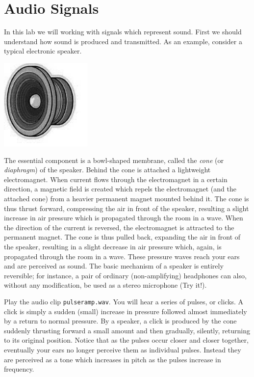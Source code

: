 \def\x{{\bf x}}
\def\q{{\bf q}}
\def\p{{\bf p}}
\def\v{{\bf v}}


\section*{Audio Signals}

In this lab we will working with signals which represent sound. First we should understand how sound is produced and transmitted. As an example, consider a typical electronic speaker.

\begin{center}\includegraphics[width=45mm]{speaker}\end{center}

The essential component is a bowl-shaped membrane, called the \emph{cone} (or \emph{diaphragm}) of the speaker. Behind the cone is attached a lightweight electromagnet. When current flows through the electromagnet in a certain direction, a magnetic field is created which repels the electromagnet (and the attached cone) from a  heavier permanent magnet mounted behind it. The cone is thus thrust forward, compressing the air in front of the speaker, resulting a slight increase in air pressure which is propagated through the room in a wave. When the direction of the current is reversed, the electromagnet is attracted to the permanent magnet. The cone is thus pulled back, expanding the air in front of the speaker, resulting in a slight decrease in air pressure which, again, is propagated through the room in a wave. These pressure waves reach your ears and are perceived as sound. The basic mechanism of a speaker is entirely reversible; for instance, a pair of ordinary (non-amplifying) headphones can also, without any modification, be used as a stereo microphone (Try it!).

Play the audio clip \texttt{pulseramp.wav}. You will hear a series of pulses, or clicks. A click is simply a sudden (small) increase in pressure followed almost immediately by a return to normal pressure. By a speaker, a click is produced by the cone suddenly thrusting forward a small amount and then gradually, silently, returning to its original position. Notice that as the pulses occur closer and closer together, eventually your ears no longer perceive them as individual pulses. Instead they are perceived as a tone which increases in pitch as the pulses increase in frequency.


